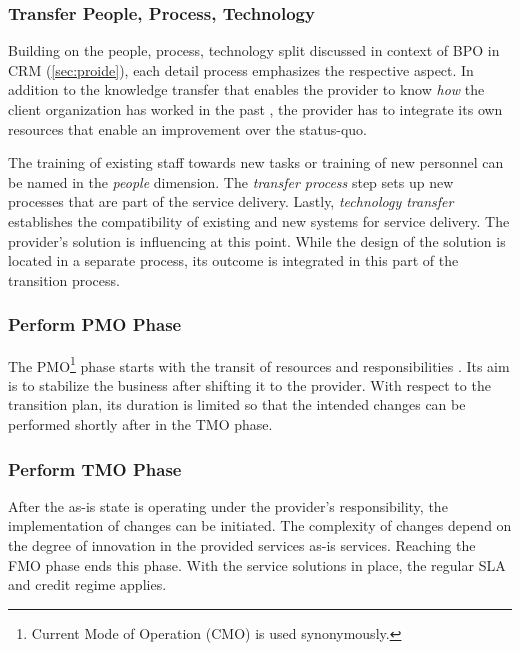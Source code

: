 	\subsubsection{Transfer People, Process, Technology}
	
	Building on the people, process, technology split discussed in context of  \acrshort{BPO} in \acrshort{CRM} (\cf \ref{sec:proide}), each detail process emphasizes the respective aspect. In addition to the knowledge transfer that enables the provider to know \textit{how} the client organization has worked in the past \citep{perunovic2007outsourcing}, the provider has to integrate its own resources that enable an improvement over the status-quo.
	
	The training of existing staff towards new tasks or training of new personnel can be named in the \textit{people} dimension. The \textit{transfer process} step sets up new processes that are part of the service delivery. Lastly, \textit{technology transfer} establishes the compatibility of existing and new systems for service delivery. The provider's solution is influencing at this point. While the design of the solution is located in a separate process, its outcome is integrated in this part of the transition process. 
	
	\subsubsection{Perform \acrshort{PMO} Phase}
	The \acrshort{PMO}\footnote{Current Mode of Operation (CMO) is used synonymously. } phase starts with the transit of resources and responsibilities \citep{bitkom2008}. Its aim is to stabilize the business after shifting it to the provider. With respect to the transition plan, its duration is limited so that the intended changes can be performed shortly after in the \acrshort{TMO} phase.
	
	\subsubsection{Perform \acrshort{TMO} Phase}
	After the as-is state is operating under the provider's responsibility, the implementation of changes can be initiated. The complexity of changes depend on the degree of innovation in the provided services \wrt as-is services. Reaching the \acrshort{FMO} phase ends this phase. With the service solutions in place, the regular \acrshort{SLA} and credit regime applies.
	
	
	
